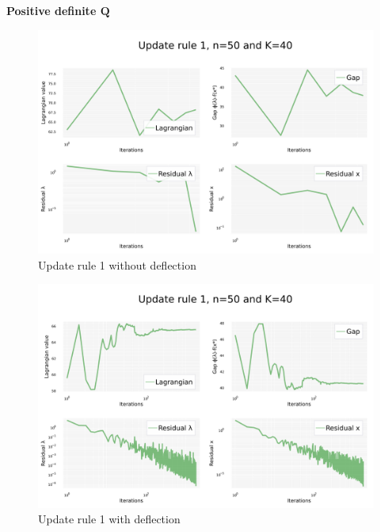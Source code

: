 \documentclass[notitlepage]{article}
\begin{document}

\begin{center}
  {\Large\bfseries Positive definite $\mathbf{Q}$}
\end{center}

\begin{figure}[H]
  \centering
  \includegraphics[scale=0.25]{pics/pd_q/Rule=1_n=50_K=40_defl=false.png}
  \caption{Update rule 1 without deflection}
  \label{fig:rule-1-n-50-k-40}
\end{figure}

\begin{figure}[H]
  \centering
  \includegraphics[scale=0.25]{pics/pd_q/Rule=1_n=50_K=40_defl=true.png}
  \caption{Update rule 1 with deflection}
  \label{fig:rule-1-n-50-k-40-defl}
\end{figure}
\end{document}

